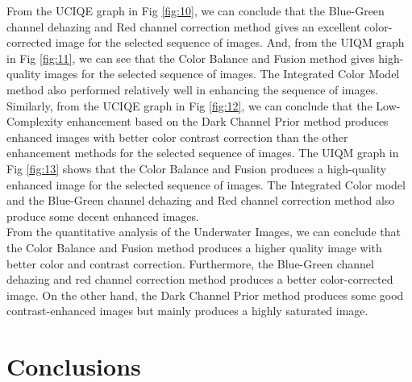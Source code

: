 \documentclass[a4paper,11pt,oneside]{article}
\begin{document}
  From the UCIQE graph in Fig \ref{fig:10}, we can conclude that the Blue-Green channel dehazing and Red channel correction method gives an excellent color-corrected image for the selected sequence of images. And, from the UIQM graph in Fig \ref{fig:11}, we can see that the Color Balance and Fusion method gives high-quality images for the selected sequence of images. The Integrated Color Model method also performed relatively well in enhancing the sequence of images.\\
  Similarly, from the UCIQE graph in Fig \ref{fig:12}, we can conclude that the Low-Complexity enhancement based on the Dark Channel Prior \cite{8} method produces enhanced images with better color contrast correction than the other enhancement methods for the selected sequence of images. The UIQM graph in Fig \ref{fig:13} shows that the Color Balance and Fusion \cite{16} produces a high-quality enhanced image for the selected sequence of images. The Integrated Color model and the Blue-Green channel dehazing and Red channel correction method also produce some decent enhanced images.\\
  From the quantitative analysis of the Underwater Images, we can conclude that the Color Balance and Fusion method \cite{16} produces a higher quality image with better color and contrast correction. Furthermore, the Blue-Green channel dehazing and red channel correction method produces a better color-corrected image. On the other hand, the Dark Channel Prior method \cite{8} produces some good contrast-enhanced images but mainly produces a highly saturated image.
  \newpage
\section{Conclusions}
\label{sec:5}

\end{document}
